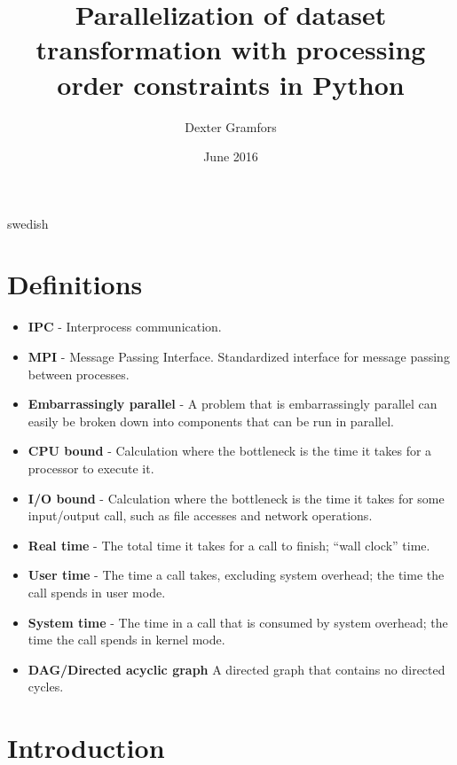 \documentclass[a4paper,11pt,openany]{kth-mag}
\title{Parallelization of dataset transformation with processing order constraints in Python}
\author{Dexter Gramfors}
\date{June 2016}
\begin{document}
\frontmatter
\pagestyle{empty}
\removepagenumbers
\maketitle
{}
\begin{abstract}
    
\end{abstract}
\clearpage
\begin{foreignabstract}{swedish}
    
\end{foreignabstract}
\clearpage
\tableofcontents*
\clearpage
\listoffigures
\mainmatter
\chapter*{Definitions}
\begin{itemize}[label={}, leftmargin=*]
  \item \textbf{IPC} - Interprocess communication.
  \item \textbf{MPI} - Message Passing Interface. Standardized interface for message passing between processes.
  \item \textbf{Embarrassingly parallel} - A problem that is embarrassingly parallel can easily be broken down into components that
    can be run in parallel. %
  \item \textbf{CPU bound} - Calculation where the bottleneck is the time it takes for a processor to execute it.
  \item \textbf{I/O bound} - Calculation where the bottleneck is the time it takes for some input/output call, such as file accesses
    and network operations.
  \item \textbf{Real time} - The total time it takes for a call to finish; ``wall clock'' time.
  \item \textbf{User time} - The time a call takes, excluding system overhead; the time the call spends in user mode.
  \item \textbf{System time} - The time in a call that is consumed by system overhead; the time the call spends in kernel mode.
  \item \textbf{DAG/Directed acyclic graph} A directed graph that contains no directed cycles.
\end{itemize}

\pagestyle{newchap}
\chapter{Introduction}
    
\end{document}
